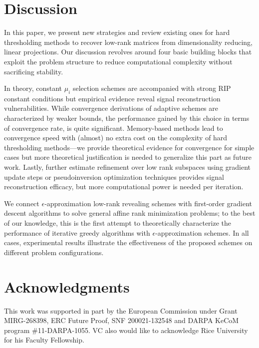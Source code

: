\documentclass[twocolumn]{svjour3}
\begin{document}
\section{Discussion}{\label{sec: conc}}

In this paper, we present new strategies and review existing ones for hard thresholding methods to recover low-rank matrices from dimensionality reducing, linear projections. Our discussion revolves around four basic building blocks that exploit the problem structure to reduce computational complexity without sacrificing stability.  

In theory, constant $ \mu_i $ selection schemes are accompanied with strong RIP constant conditions but empirical evidence reveal signal reconstruction vulnerabilities. While convergence derivations of adaptive schemes are characterized by weaker bounds, the performance gained by this choice in terms of convergence rate, is quite significant. Memory-based methods lead to convergence speed with (almost) no extra cost on the complexity of hard thresholding methods---we provide theoretical evidence for convergence for simple cases but more theoretical justification is needed to generalize this part as future work. Lastly, further estimate refinement over low rank subspaces using gradient update steps or pseudoinversion optimization techniques provides signal reconstruction efficacy, but more computational power is needed per iteration. 

We connect $\epsilon$-approximation low-rank revealing schemes with first-order gradient descent algorithms to solve general affine rank minimization problems; to the best of our knowledge, this is the first attempt to theoretically characterize the performance of iterative greedy algorithms with $\epsilon$-approximation schemes. In all cases, experimental results illustrate the effectiveness of the proposed schemes on different problem configurations.

\section*{Acknowledgments}
This work was supported in part by the European Commission under Grant MIRG-268398, ERC Future Proof, SNF 200021-132548 and DARPA KeCoM program \#11-DARPA-1055. VC also would like to acknowledge Rice University for his Faculty Fellowship.

\appendix
\end{document}

